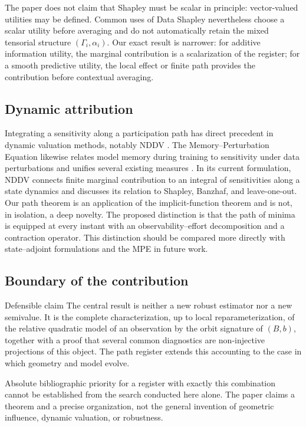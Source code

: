 The paper does not claim that Shapley must be scalar in principle: vector-valued utilities may be defined. Common uses of Data Shapley nevertheless choose a scalar utility before averaging and do not automatically retain the mixed tensorial structure $(\Gamma_i,\alpha_i)$. Our exact result is narrower: for additive information utility, the marginal contribution is a scalarization of the register; for a smooth predictive utility, the local effect or finite path provides the contribution before contextual averaging.

\subsection{Dynamic attribution}
Integrating a sensitivity along a participation path has direct precedent in dynamic valuation methods, notably NDDV \citep{liang2024nddv}. The Memory--Perturbation Equation likewise relates model memory during training to sensitivity under data perturbations and unifies several existing measures \citep{nickl2023mpe}. In its current formulation, NDDV connects finite marginal contribution to an integral of sensitivities along a state dynamics and discusses its relation to Shapley, Banzhaf, and leave-one-out. Our path theorem is an application of the implicit-function theorem and is not, in isolation, a deep novelty. The proposed distinction is that the path of minima is equipped at every instant with an observability--effort decomposition and a contraction operator. This distinction should be compared more directly with state--adjoint formulations and the MPE in future work.

\subsection{Boundary of the contribution}
\begin{statementbox}{Defensible claim}
The central result is neither a new robust estimator nor a new semivalue. It is the complete characterization, up to local reparameterization, of the relative quadratic model of an observation by the orbit signature of $(B,b)$, together with a proof that several common diagnostics are non-injective projections of this object. The path register extends this accounting to the case in which geometry and model evolve.
\end{statementbox}
Absolute bibliographic priority for a register with exactly this combination cannot be established from the search conducted here alone. The paper claims a theorem and a precise organization, not the general invention of geometric influence, dynamic valuation, or robustness.

